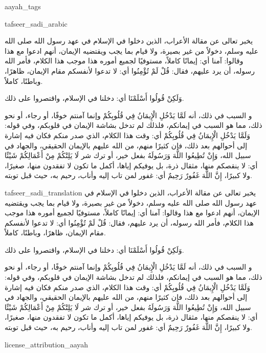 \begin{taggedblock}{aayah_tags}
\end{taggedblock}
\begin{taggedblock}{tafseer_sadi_arabic}
\begin{Arabic}
يخبر تعالى عن مقالة الأعراب، الذين دخلوا في الإسلام في عهد رسول الله صلى الله عليه وسلم، دخولاً من غير بصيرة، ولا قيام بما يجب ويقتضيه الإيمان، أنهم ادعوا مع هذا وقالوا: آمنا أي: إيمانًا كاملاً، مستوفيًا لجميع أموره هذا موجب هذا الكلام، فأمر الله رسوله، أن يرد عليهم، فقال:
{ قُلْ لَمْ تُؤْمِنُوا }
أي: لا تدعوا لأنفسكم مقام الإيمان، ظاهرًا، وباطنًا، كاملاً.

{ وَلَكِنْ قُولُوا أَسْلَمْنَا }
أي: دخلنا في الإسلام، واقتصروا على ذلك.

{ و }
السبب في ذلك، أنه
{ لَمَّا يَدْخُلِ الْإِيمَانُ فِي قُلُوبِكُمْ }
وإنما آمنتم خوفًا، أو رجاء، أو نحو ذلك، مما هو السبب في إيمانكم، فلذلك لم تدخل بشاشة الإيمان في قلوبكم، وفي قوله:
{ وَلَمَّا يَدْخُلِ الْإِيمَانُ فِي قُلُوبِكُمْ }
أي: وقت هذا الكلام، الذي صدر منكم فكان فيه إشارة إلى أحوالهم بعد ذلك، فإن كثيرًا منهم، من الله عليهم بالإيمان الحقيقي، والجهاد في سبيل الله،
{ وَإِنْ تُطِيعُوا اللَّهَ وَرَسُولَهُ }
بفعل خير، أو ترك شر
{ لَا يَلِتْكُمْ مِنْ أَعْمَالِكُمْ شَيْئًا }
أي: لا ينقصكم منها، مثقال ذرة، بل يوفيكم إياها، أكمل ما تكون لا تفقدون منها، صغيرًا، ولا كبيرًا،
{ إِنَّ اللَّهَ غَفُورٌ رَحِيمٌ }
أي: غفور لمن تاب إليه وأناب، رحيم به، حيث قبل توبته.
\end{Arabic}
\end{taggedblock}
\begin{taggedblock}{tafseer_sadi_translation}
يخبر تعالى عن مقالة الأعراب، الذين دخلوا في الإسلام في عهد رسول الله صلى الله عليه وسلم، دخولاً من غير بصيرة، ولا قيام بما يجب ويقتضيه الإيمان، أنهم ادعوا مع هذا وقالوا: آمنا أي: إيمانًا كاملاً، مستوفيًا لجميع أموره هذا موجب هذا الكلام، فأمر الله رسوله، أن يرد عليهم، فقال:
{ قُلْ لَمْ تُؤْمِنُوا }
أي: لا تدعوا لأنفسكم مقام الإيمان، ظاهرًا، وباطنًا، كاملاً.

{ وَلَكِنْ قُولُوا أَسْلَمْنَا }
أي: دخلنا في الإسلام، واقتصروا على ذلك.

{ و }
السبب في ذلك، أنه
{ لَمَّا يَدْخُلِ الْإِيمَانُ فِي قُلُوبِكُمْ }
وإنما آمنتم خوفًا، أو رجاء، أو نحو ذلك، مما هو السبب في إيمانكم، فلذلك لم تدخل بشاشة الإيمان في قلوبكم، وفي قوله:
{ وَلَمَّا يَدْخُلِ الْإِيمَانُ فِي قُلُوبِكُمْ }
أي: وقت هذا الكلام، الذي صدر منكم فكان فيه إشارة إلى أحوالهم بعد ذلك، فإن كثيرًا منهم، من الله عليهم بالإيمان الحقيقي، والجهاد في سبيل الله،
{ وَإِنْ تُطِيعُوا اللَّهَ وَرَسُولَهُ }
بفعل خير، أو ترك شر
{ لَا يَلِتْكُمْ مِنْ أَعْمَالِكُمْ شَيْئًا }
أي: لا ينقصكم منها، مثقال ذرة، بل يوفيكم إياها، أكمل ما تكون لا تفقدون منها، صغيرًا، ولا كبيرًا،
{ إِنَّ اللَّهَ غَفُورٌ رَحِيمٌ }
أي: غفور لمن تاب إليه وأناب، رحيم به، حيث قبل توبته.
\end{taggedblock}
\begin{taggedblock}{license_attribution_aayah}

\end{taggedblock}
\begin{comment}
Please use the following for footnotes:- Sample\footnoteQ{Text of Qur'an footnote goes here.}.
Sample\footnoteT{Text of Tafseer footnote goes here.}.
\end{comment}